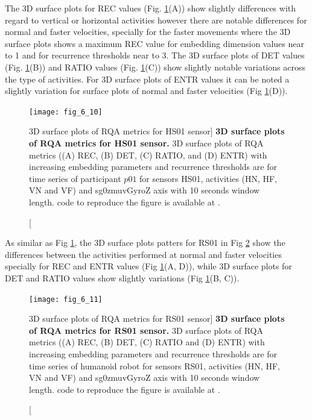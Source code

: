 The 3D surface plots for REC values (Fig. \ref{fig:topo_sa_hs01}(A))
show slightly differences with regard to vertical or horizontal activities
however there are notable differences for normal and faster velocities, 
specially for the faster movements where the 3D surface plots shows a maximum
REC value for embedding dimension values near to 1 and for recurrence 
thresholds near to 3. 
The 3D surface plots of DET values  
(Fig. \ref{fig:topo_sa_hs01}(B)) and RATIO values 
(Fig. \ref{fig:topo_sa_hs01}(C)) show slightly notable variations across 
the type of activities. 
For 3D surface plots of ENTR values it can be noted a slightly variation for
surface plots of normal and faster velocities (Fig \ref{fig:topo_sa_hs01}(D)).
\begin{figure}
\centering
\texttt{[image: fig\_6\_10]}
    \caption
	[3D surface plots of RQA metrics for HS01 sensor]{
	{\bf 3D surface plots of RQA metrics for HS01 sensor.}
	3D surface plots of RQA metrics ((A) REC, (B) DET, (C) RATIO, and (D) ENTR) 
	with increasing embedding parameters and recurrence thresholds 
	are for time series of participant $p01$ for 
	sensors HS01, activities (HN, HF, VN and VF) and 
	sg0zmuvGyroZ axis with 10 seconds window length. 
	\R code to reproduce the figure is available at 
	.
       }
\label{fig:topo_sa_hs01}
\end{figure}

As similar as Fig \ref{fig:topo_sa_hs01}, the 3D surface plots patters 
for RS01 in Fig \ref{fig:topo_sa_rs01} show the differences between 
the activities performed at normal and faster velocities
specially for REC and ENTR values (Fig \ref{fig:topo_sa_hs01}(A, D)),
while 3D surface plots for DET and RATIO values show slightly variations
(Fig \ref{fig:topo_sa_hs01}(B, C)).
\begin{figure}
\centering
\texttt{[image: fig\_6\_11]}
    \caption
	[3D surface plots of RQA metrics for RS01 sensor]{
	{\bf 3D surface plots of RQA metrics for RS01 sensor.}
	3D surface plots of RQA metrics ((A) REC, (B) DET, (C) RATIO and (D) ENTR) 
	with increasing embedding parameters and recurrence thresholds 
	are for time series of humanoid robot for 
	sensors RS01, activities (HN, HF, VN and VF) and 
	sg0zmuvGyroZ axis with 10 seconds window length. 
	\R code to reproduce the figure is available at 
	.
       }
\label{fig:topo_sa_rs01}
\end{figure}

